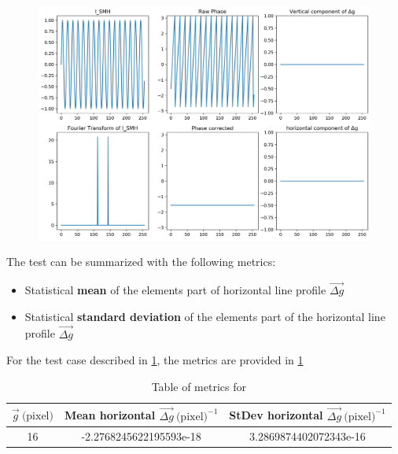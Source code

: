 \documentclass[12pt, titlepage]{article}
\begin{document}
\begin{figure}[H]
\begin{center}
\includegraphics[scale=0.5]{Figures/Test_2_explanation_1D.png}
\caption{}
\label{fig:Test_2_explaination_1D}
\end{center}
\end{figure}

The test can be summarized with the following metrics:
\begin{itemize}
\item Statistical \textbf{mean} of the elements part of horizontal line profile $\overrightarrow{\Delta g}$
\item Statistical \textbf{standard deviation} of the elements part of the horizontal line profile $\overrightarrow{\Delta g}$
\end{itemize}

For the test case described in \cref{fig:Test_2_explaination_1D}, the metrics are provided in \cref{tb:Metric_test_2_single_case}

\begin{table}[H]
\centering
\begin{tabular}{|c|c|c|}
\hline
$\overrightarrow{g} \ \text{(pixel)}$ & Mean horizontal $\overrightarrow{\Delta g} \ \text{(pixel)}^{-1}$ & StDev horizontal $\overrightarrow{\Delta g} \ \text{(pixel)}^{-1}$ \\
\hline
16			& -2.2768245622195593e-18 & 3.2869874402072343e-16 \\ \hline
\end{tabular}
\caption{Table of metrics for}\label{tb:Metric_test_2_single_case}
\end{table}
\end{document}
